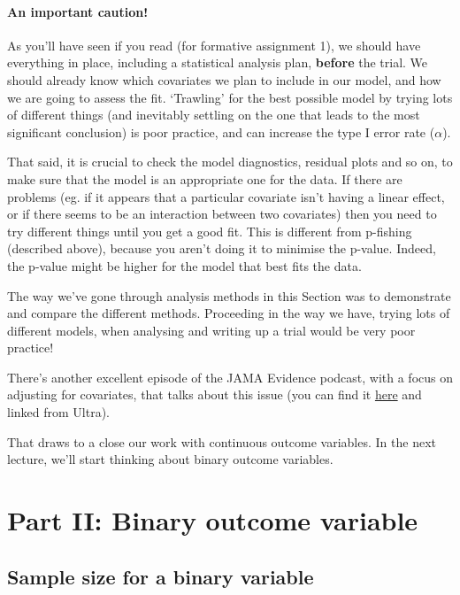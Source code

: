 \documentclass[
  openany]{book}
\theoremstyle{definition}
\theoremstyle{definition}
\theoremstyle{definition}
\theoremstyle{definition}
\theoremstyle{remark}
\begin{document}
\subsection*{An important caution!}\label{an-important-caution}

As you'll have seen if you read \citet{kendall2003designing} (for formative assignment 1), we should have everything in place, including a statistical analysis plan, \textbf{before} the trial. We should already know which covariates we plan to include in our model, and how we are going to assess the fit. `Trawling' for the best possible model by trying lots of different things (and inevitably settling on the one that leads to the most significant conclusion) is poor practice, and can increase the type I error rate (\(\alpha\)).

That said, it is crucial to check the model diagnostics, residual plots and so on, to make sure that the model is an appropriate one for the data. If there are problems (eg. if it appears that a particular covariate isn't having a linear effect, or if there seems to be an interaction between two covariates) then you need to try different things until you get a good fit. This is different from p-fishing (described above), because you aren't doing it to minimise the p-value. Indeed, the p-value might be higher for the model that best fits the data.

The way we've gone through analysis methods in this Section was to demonstrate and compare the different methods. Proceeding in the way we have, trying lots of different models, when analysing and writing up a trial would be very poor practice!

There's another excellent episode of the JAMA Evidence podcast, with a focus on adjusting for covariates, that talks about this issue (you can find it \href{https://edhub.ama-assn.org/jn-learning/audio-player/18836864}{here} and linked from Ultra).

That draws to a close our work with continuous outcome variables. In the next lecture, we'll start thinking about binary outcome variables.

\part{Part II: Binary outcome variable}\label{part-part-ii-binary-outcome-variable}

\chapter{Sample size for a binary variable}\label{ss-bin}
\end{document}
